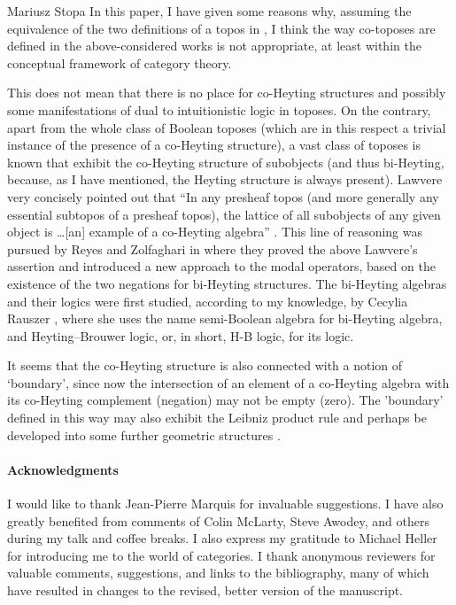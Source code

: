 \begin{artengenv}{Mariusz Stopa}
In this paper, I have given some reasons why, assuming the equivalence of the two definitions of a topos in \parencite[p.161f and 163]{maclane-moerdijk-1994}, I think the way co-toposes are defined in the above-considered works \parencite{mortensen-1995, mortensen-2003, james-phd-1996, estrada-gonzalez-2010, estrada-gonzalez-2015} is not appropriate, at least within the conceptual framework of category theory.

This does not mean that there is no place for co-Heyting structures and possibly some manifestations of dual to intuitionistic logic in toposes. On the contrary, apart from the whole class of Boolean toposes (which are in this respect a trivial instance of the presence of a co-Heyting structure), a vast class of toposes is known that exhibit the co-Heyting structure of subobjects (and thus bi-Heyting, because, as I have mentioned, the Heyting structure is always present). Lawvere \parencite*{lawvere-1991} very concisely pointed out that ``In any presheaf topos (and more generally any essential subtopos of a presheaf topos), the lattice of all subobjects of any given object is \ldots [an] example of a co-Heyting algebra'' \parencite[p.280]{lawvere-1991}. This line of reasoning was pursued by Reyes and Zolfaghari in \parencite{reyes-zolfaghari-1996} where they proved the above Lawvere's assertion and introduced a new approach to the modal operators, based on the existence of the two negations for bi-Heyting structures. The bi-Heyting algebras and their logics were first studied, according to my knowledge, by Cecylia Rauszer \parencite*{rauszer-1974, rauszer-1974-2}, where she uses the name semi-Boolean algebra for bi-Heyting algebra, and Heyting--Brouwer logic, or, in short, H-B logic, for its logic. 


It seems that the co-Heyting structure is also connected with a notion of `boundary', since now the intersection of an element of a co-Heyting algebra with its co-Heyting complement (negation) may not be empty (zero). The 'boundary' defined in this way %
may also exhibit the Leibniz product rule and perhaps be developed into some further geometric structures \parencites[cf.][]{lawvere-1991}[especially pp.123--126]{majid-2012}.


\paragraph{Acknowledgments}
I would like to thank Jean-Pierre Marquis for invaluable suggestions. I have also greatly benefited from comments of Colin McLarty, Steve Awodey, and others during my talk and coffee breaks. I also express my gratitude to Michael Heller for introducing me to the world of categories. I thank anonymous reviewers for valuable comments, suggestions, and links to the bibliography, many of which have resulted in changes to the revised, better version of the manuscript.


\end{artengenv}
